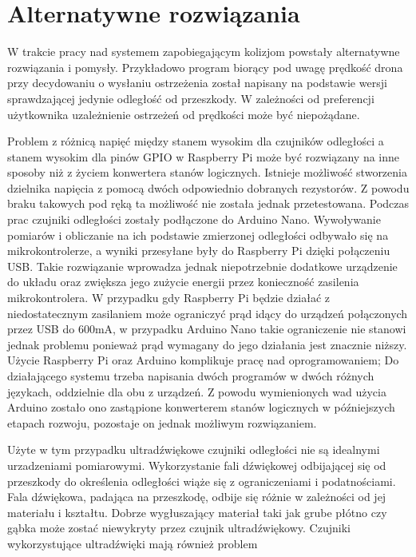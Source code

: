 \documentclass[a4paper,12pt]{book}
\begin{document}
    \section{Alternatywne rozwiązania}
        W trakcie pracy nad systemem zapobiegającym kolizjom powstały alternatywne rozwiązania i pomysły. 
        Przykładowo program biorący pod uwagę prędkość drona przy decydowaniu o wysłaniu ostrzeżenia został napisany na podstawie wersji sprawdzającej 
        jedynie odległość od przeszkody. W zależności od preferencji użytkownika uzależnienie ostrzeżeń od prędkości może być niepożądane.\par
        Problem z różnicą napięć między stanem wysokim dla czujników odległości a stanem wysokim dla pinów GPIO w Raspberry Pi może być rozwiązany 
        na inne sposoby niż z życiem konwertera stanów logicznych. Istnieje możliwość stworzenia dzielnika napięcia z pomocą dwóch odpowiednio dobranych rezystorów. 
        Z powodu braku takowych pod ręką ta możliwość nie została jednak przetestowana. Podczas prac 
        czujniki odległości zostały podłączone do Arduino Nano. Wywoływanie pomiarów i obliczanie na ich podstawie zmierzonej odległości odbywało się na mikrokontrolerze, a wyniki 
        przesyłane były do Raspberry Pi dzięki połączeniu USB. Takie rozwiązanie wprowadza jednak niepotrzebnie dodatkowe urządzenie do układu oraz zwiększa jego zużycie energii przez 
        konieczność zasilenia mikrokontrolera. W przypadku gdy Raspberry Pi będzie działać z niedostatecznym zasilaniem może ograniczyć prąd idący do urządzeń połączonych przez USB do \mbox{600mA\cite{web:raspberry:pi:documentation:power:supply}}, 
        w przypadku Arduino Nano takie ograniczenie nie stanowi jednak problemu ponieważ prąd wymagany do jego działania jest znacznie niższy. Użycie Raspberry Pi oraz Arduino komplikuje 
        pracę nad oprogramowaniem; Do działającego systemu trzeba napisania dwóch programów w dwóch różnych językach, oddzielnie dla obu z urządzeń. Z powodu wymienionych wad 
        użycia Arduino zostało ono zastąpione konwerterem stanów logicznych w późniejszych etapach rozwoju, pozostaje on jednak możliwym rozwiązaniem.\par
        Użyte w tym przypadku ultradźwiękowe czujniki odległości nie są idealnymi urzadzeniami pomiarowymi. Wykorzystanie fali dźwiękowej odbijającej się od przeszkody do 
        określenia odległości wiąże się z ograniczeniami i podatnościami. Fala dźwiękowa, padająca na przeszkodę, odbije się różnie w zależności od jej materiału i kształtu. 
        Dobrze wygłuszający materiał taki jak grube płótno czy gąbka może zostać niewykryty przez czujnik ultradźwiękowy. Czujniki wykorzystujące ultradźwięki mają również problem 
\end{document}
